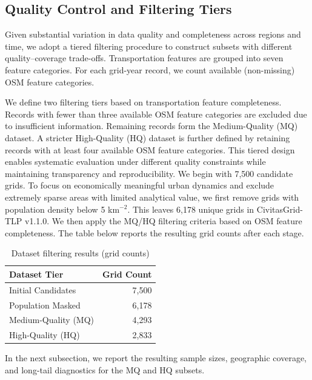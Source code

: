 \documentclass[11pt,conference,onecolumn]{IEEEtran}
\begin{document}
\subsection{Quality Control and Filtering Tiers}

Given substantial variation in data quality and completeness across regions and time, we adopt a tiered filtering procedure to construct subsets with different quality–coverage trade-offs. Transportation features are grouped into seven feature categories. For each grid-year record, we count available (non-missing) OSM feature categories.

We define two filtering tiers based on transportation feature completeness. Records with fewer than three available OSM feature categories are excluded due to insufficient information. Remaining records form the Medium-Quality (MQ) dataset. A stricter High-Quality (HQ) dataset is further defined by retaining records with at least four available OSM feature categories. This tiered design enables systematic evaluation under different quality constraints while maintaining transparency and reproducibility. We begin with 7,500 candidate grids. To focus on economically meaningful urban dynamics and exclude extremely sparse areas with limited analytical value, we first remove grids with population density below 5 km$^{-2}$. This leaves 6,178 unique grids in CivitasGrid-TLP v1.1.0. We then apply the MQ/HQ filtering criteria based on OSM feature completeness. The table below reports the resulting grid counts after each stage.
\begin{table}[H]
    \centering
    \begin{tabular}{lr}
        \toprule
        \textbf{Dataset Tier} & \textbf{Grid Count}\\
        \midrule
        Initial Candidates & 7,500 \\
        Population Masked & 6,178 \\
        Medium-Quality (MQ) & 4,293 \\
        High-Quality (HQ) & 2,833 \\
        \bottomrule
    \end{tabular}
    \caption{Dataset filtering results (grid counts)}
    \label{tab:filtering}

\end{table}

In the next subsection, we report the resulting sample sizes, geographic coverage, and long-tail diagnostics for the MQ and HQ subsets.
\end{document}
